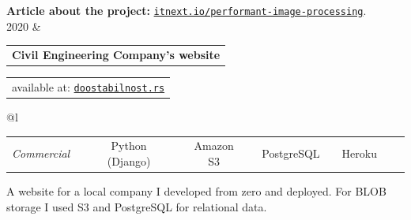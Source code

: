 \documentclass[11pt]{article}
\makeatletter
\newcommand{\projectentry}[5][0.25em]{
	\begin{tabular}{@{}l} %
		{\bfseries #3}	%
	\end{tabular}
	\vspace{0.3em}
	\hfill
	\begin{tabular}{l@{}}
		{#4} %
	\end{tabular} 
	\newline
	\begin{tabular}{@{}l}
		{#2} %
	\end{tabular}

	\vspace{0.25em}
	#5
}
\makeatother
\begin{document}
{{\vspace{0.35em}
\textbf{\small Article about the project:} \href{https://itnext.io/performant-image-processing-with-go-pipelines-and-bounded-concurrency-3f721ec5dde8}{\tt itnext.io/performant-image-processing}}.
\vspace{0.75em} \\ 
2020 & \projectentry{\small \begin{tabular}{@{}l c c c c c c c c c c}\textit{Commercial} & \textendash & Python (Django) & \textendash & Amazon S3 & \textendash & PostgreSQL & \textendash & Heroku \end{tabular}}{Civil Engineering Company's website}{\small available at: \href{https://doostabilnost.rs}{\tt doostabilnost.rs}}
{A website for a local company I developed from zero and deployed. For BLOB storage I used S3 and PostgreSQL for relational data.} \vspace{0.75em} \\ 
}
\end{document}
